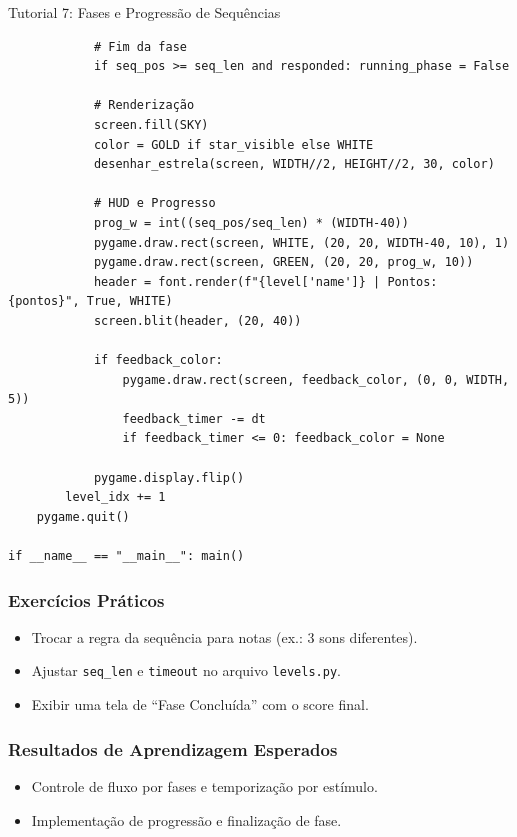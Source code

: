 \documentclass[11pt,a4paper]{article}
\begin{document}
\begin{boxTutorial}{Tutorial 7: Fases e Progressão de Sequências}
\begin{enumerate}
\begin{verbatim}
            # Fim da fase
            if seq_pos >= seq_len and responded: running_phase = False

            # Renderização
            screen.fill(SKY)
            color = GOLD if star_visible else WHITE
            desenhar_estrela(screen, WIDTH//2, HEIGHT//2, 30, color)
            
            # HUD e Progresso
            prog_w = int((seq_pos/seq_len) * (WIDTH-40))
            pygame.draw.rect(screen, WHITE, (20, 20, WIDTH-40, 10), 1)
            pygame.draw.rect(screen, GREEN, (20, 20, prog_w, 10))
            header = font.render(f"{level['name']} | Pontos: {pontos}", True, WHITE)
            screen.blit(header, (20, 40))
            
            if feedback_color:
                pygame.draw.rect(screen, feedback_color, (0, 0, WIDTH, 5))
                feedback_timer -= dt
                if feedback_timer <= 0: feedback_color = None
            
            pygame.display.flip()
        level_idx += 1
    pygame.quit()

if __name__ == "__main__": main()
    \end{verbatim}
    \end{enumerate}

    \subsubsection*{Exercícios Práticos}
    \begin{itemize}
        \item Trocar a regra da sequência para notas (ex.: 3 sons diferentes).
        \item Ajustar \texttt{seq\_len} e \texttt{timeout} no arquivo \texttt{levels.py}.
        \item Exibir uma tela de ``Fase Concluída'' com o score final.
    \end{itemize}

    \subsubsection*{Resultados de Aprendizagem Esperados}
    \begin{itemize}
        \item Controle de fluxo por fases e temporização por estímulo.
        \item Implementação de progressão e finalização de fase.
    \end{itemize}
\end{boxTutorial}
\end{document}
